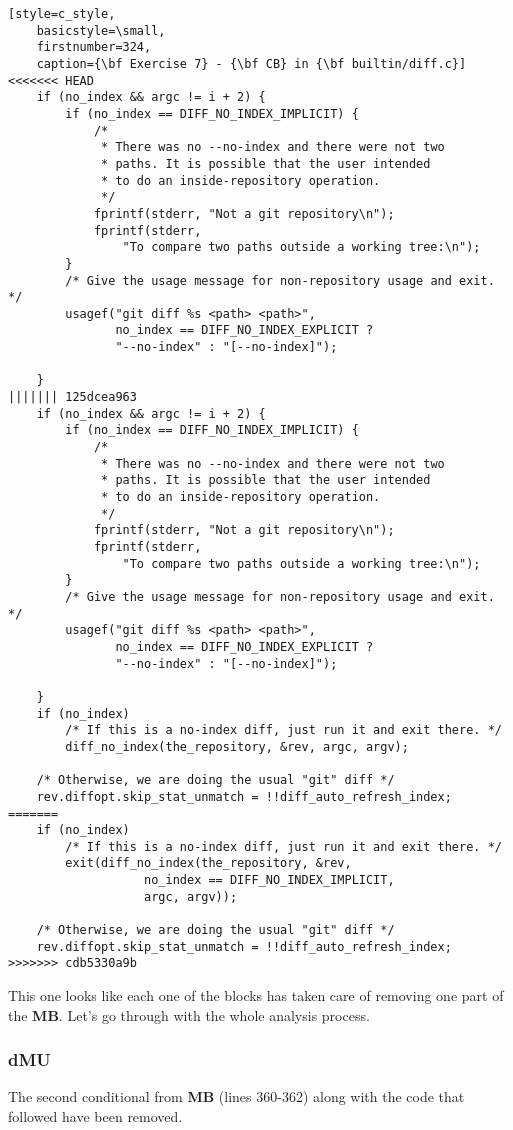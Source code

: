 \begin{lstlisting}[style=c_style,
	basicstyle=\small,
	firstnumber=324,
	caption={\bf Exercise 7} - {\bf CB} in {\bf builtin/diff.c}]
<<<<<<< HEAD
	if (no_index && argc != i + 2) {
		if (no_index == DIFF_NO_INDEX_IMPLICIT) {
			/*
			 * There was no --no-index and there were not two
			 * paths. It is possible that the user intended
			 * to do an inside-repository operation.
			 */
			fprintf(stderr, "Not a git repository\n");
			fprintf(stderr,
				"To compare two paths outside a working tree:\n");
		}
		/* Give the usage message for non-repository usage and exit. */
		usagef("git diff %s <path> <path>",
		       no_index == DIFF_NO_INDEX_EXPLICIT ?
		       "--no-index" : "[--no-index]");

	}
||||||| 125dcea963
	if (no_index && argc != i + 2) {
		if (no_index == DIFF_NO_INDEX_IMPLICIT) {
			/*
			 * There was no --no-index and there were not two
			 * paths. It is possible that the user intended
			 * to do an inside-repository operation.
			 */
			fprintf(stderr, "Not a git repository\n");
			fprintf(stderr,
				"To compare two paths outside a working tree:\n");
		}
		/* Give the usage message for non-repository usage and exit. */
		usagef("git diff %s <path> <path>",
		       no_index == DIFF_NO_INDEX_EXPLICIT ?
		       "--no-index" : "[--no-index]");

	}
	if (no_index)
		/* If this is a no-index diff, just run it and exit there. */
		diff_no_index(the_repository, &rev, argc, argv);

	/* Otherwise, we are doing the usual "git" diff */
	rev.diffopt.skip_stat_unmatch = !!diff_auto_refresh_index;
=======
	if (no_index)
		/* If this is a no-index diff, just run it and exit there. */
		exit(diff_no_index(the_repository, &rev,
				   no_index == DIFF_NO_INDEX_IMPLICIT,
				   argc, argv));

	/* Otherwise, we are doing the usual "git" diff */
	rev.diffopt.skip_stat_unmatch = !!diff_auto_refresh_index;
>>>>>>> cdb5330a9b
\end{lstlisting}

This one looks like each one of the blocks has taken care of removing one part of the {\bf MB}. Let's go through
with the whole analysis process.

\subsubsection*{dMU}
The second conditional from {\bf MB} (lines 360-362) along with the code that followed have been removed.

